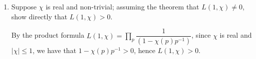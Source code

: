 \documentclass{article}
\begin{document}
\begin{enumerate}
    \item Suppose $\chi$ is real and non-trivial; assuming the theorem that $L(1, \chi)\neq 0$, show directly that $L(1, \chi)>0$.
    
    \begin{solution}
        By the product formula $L(1,\chi)=\prod_p \dfrac1{(1-\chi(p)p^{-1})}$, since $\chi$ is real and $|\chi|\leq 1$, we have that $1-\chi(p)p^{-1}>0$,
        hence $L(1, \chi)>0$.
    \end{solution}
\end{enumerate}
\end{document}
